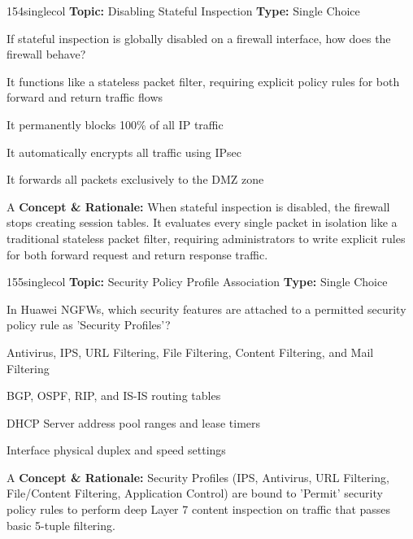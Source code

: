 \begin{qcard}{154}{singlecol}
\textcolor{darkslate!75}{\small\textbf{Topic:} Disabling Stateful Inspection \hfill \textbf{Type:} Single Choice}\vspace{0.4em}\par
If stateful inspection is globally disabled on a firewall interface, how does the firewall behave?
\begin{qoptions}
\item It functions like a stateless packet filter, requiring explicit policy rules for both forward and return traffic flows
\item It permanently blocks 100\% of all IP traffic
\item It automatically encrypts all traffic using IPsec
\item It forwards all packets exclusively to the DMZ zone
\end{qoptions}
\end{qcard}
\nopagebreak
\begin{explainbox}{A}
\textbf{Concept \& Rationale:} When stateful inspection is disabled, the firewall stops creating session tables. It evaluates every single packet in isolation like a traditional stateless packet filter, requiring administrators to write explicit rules for both forward request and return response traffic.
\end{explainbox}

\begin{qcard}{155}{singlecol}
\textcolor{darkslate!75}{\small\textbf{Topic:} Security Policy Profile Association \hfill \textbf{Type:} Single Choice}\vspace{0.4em}\par
In Huawei NGFWs, which security features are attached to a permitted security policy rule as 'Security Profiles'?
\begin{qoptions}
\item Antivirus, IPS, URL Filtering, File Filtering, Content Filtering, and Mail Filtering
\item BGP, OSPF, RIP, and IS-IS routing tables
\item DHCP Server address pool ranges and lease timers
\item Interface physical duplex and speed settings
\end{qoptions}
\end{qcard}
\nopagebreak
\begin{explainbox}{A}
\textbf{Concept \& Rationale:} Security Profiles (IPS, Antivirus, URL Filtering, File/Content Filtering, Application Control) are bound to 'Permit' security policy rules to perform deep Layer 7 content inspection on traffic that passes basic 5-tuple filtering.
\end{explainbox}

